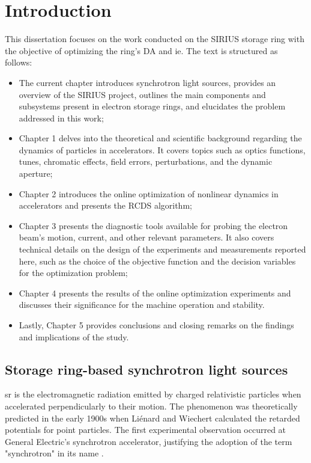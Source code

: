 \chapter*{Introduction}
This dissertation focuses on the work conducted on the SIRIUS storage ring with the objective of optimizing the ring's \gls*{DA} and \gls*{ie}. The text is structured as follows:
\begin{itemize}
    \item The current chapter introduces synchrotron light sources, provides an overview of the SIRIUS project, outlines the main components and subsystems present in electron storage rings, and elucidates the problem addressed in this work;
    \item Chapter 1 delves into the theoretical and scientific background regarding the dynamics of particles in accelerators. It covers topics such as optics functions, tunes, chromatic effects, field errors, perturbations, and the dynamic aperture;
    \item Chapter 2 introduces the online optimization of nonlinear dynamics in accelerators and presents the \gls*{RCDS} algorithm;
    \item Chapter 3 presents the diagnostic tools available for probing the electron beam's motion, current, and other relevant parameters. It also covers technical details on the design of the experiments and measurements reported here, such as the choice of the objective function and the decision variables for the optimization problem;
    \item Chapter 4 presents the results of the online optimization experiments and discusses their significance for the machine operation and stability.
    \item Lastly, Chapter 5 provides conclusions and closing remarks on the findings and implications of the study.
\end{itemize}

\section*{Storage ring-based synchrotron light sources}

\gls*{sr} is the electromagnetic radiation emitted by charged relativistic particles when accelerated perpendicularly to their motion. The phenomenon was theoretically predicted in the early 1900s when Liénard and Wiechert calculated the retarded potentials for point particles. The first experimental observation occurred at General Electric's synchrotron accelerator, justifying the adoption of the term "synchrotron" in its name \cite{wiedemann_particle_2015}.

